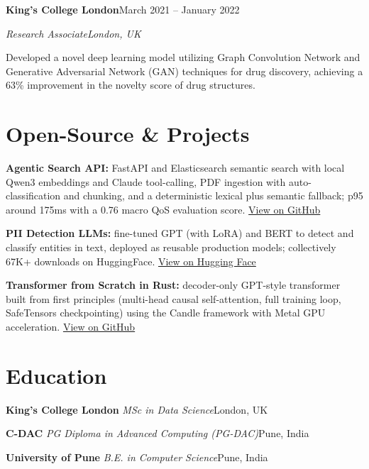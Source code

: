 \documentclass[10pt,a4paper]{article}
\newcommand{\entry}[4]{%
  {\color{company}\bfseries #1}\hfill {\color{muted}#2}\par
  \vspace{1pt}
  {\itshape #3}\hfill {\color{muted}\itshape #4}\par
  \vspace{3pt}%
}
\newcommand{\sep}{\,\textcolor{accent!60}{\textbar}\,}
\begin{document}
\entry{King's College London}{March 2021 -- January 2022}{Research Associate}{London, UK}
\begin{tight}
  \item Developed a novel deep learning model utilizing Graph Convolution Network and Generative Adversarial Network (GAN) techniques for drug discovery, achieving a 63\% improvement in the novelty score of drug structures.
\end{tight}

\section{Open-Source \& Projects}
\begin{tight}
  \item \textbf{Agentic Search API:} FastAPI and Elasticsearch semantic search with local Qwen3 embeddings and Claude tool-calling, PDF ingestion with auto-classification and chunking, and a deterministic lexical plus semantic fallback; p95 around 175ms with a 0.76 macro QoS evaluation score. \href{https://github.com/abhijeetscode/search-agent}{View on GitHub}
  \item \textbf{PII Detection LLMs:} fine-tuned GPT (with LoRA) and BERT to detect and classify entities in text, deployed as reusable production models; collectively 67K+ downloads on HuggingFace. \href{https://huggingface.co/ab-ai/pii_model}{View on Hugging Face}
  \item \textbf{Transformer from Scratch in Rust:} decoder-only GPT-style transformer built from first principles (multi-head causal self-attention, full training loop, SafeTensors checkpointing) using the Candle framework with Metal GPU acceleration. \href{https://github.com/abhijeetscode/transformer-rust}{View on GitHub}
\end{tight}

\section{Education}
{\color{company}\bfseries King's College London}\sep{\itshape MSc in Data Science}\hfill {\color{muted}London, UK}\par\vspace{1pt}
{\color{company}\bfseries C-DAC}\sep{\itshape PG Diploma in Advanced Computing (PG-DAC)}\hfill {\color{muted}Pune, India}\par\vspace{1pt}
{\color{company}\bfseries University of Pune}\sep{\itshape B.E. in Computer Science}\hfill {\color{muted}Pune, India}\par
\end{document}
